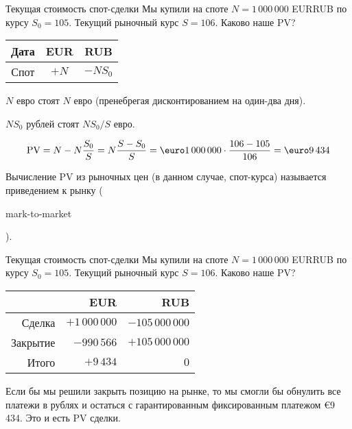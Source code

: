 \documentclass{beamer}
\renewcommand{\EUR}[1]{\textup{\euro}#1}
\newcommand{\en}[1]{\begin{otherlanguage}{english}#1\end{otherlanguage}}
\begin{document}
\begin{frame}{Текущая стоимость спот-сделки}
\justify
Мы купили на споте $N=1\,000\,000$ EURRUB по курсу $S_0 = 105$. Текущий рыночный курс $S=106$. Каково наше PV?

\justify
\centering
\begin{tabular}{c|c|c}
Дата & EUR  & RUB \\ \hline
Спот & $+N$ & $-NS_0$
\end{tabular}

\justify
$N$ евро стоят $N$ евро (пренебрегая дисконтированием на один-два дня).

\justify
$NS_0$ рублей стоят $NS_0/S$ евро.

\begin{align*}
\text{PV} = N - N\frac{S_0}{S} = N\frac{S - S_0}{S} = \EUR{1\,000\,000} \cdot \frac{106 - 105}{106} = \EUR{9\,434}
\end{align*}

\justify
Вычисление PV из рыночных цен (в данном случае, спот-курса) называется \alert{приведением к рынку} (\en{mark-to-market}).
\end{frame}



\begin{frame}{Текущая стоимость спот-сделки}
\justify
Мы купили на споте $N=1\,000\,000$ EURRUB по курсу $S_0 = 105$. Текущий рыночный курс $S=106$. Каково наше PV?

\justify
\centering
\begin{tabular}{r|r|r}
         & EUR               & RUB \\ \hline
Сделка   & $+1\,000\,000$ & $-105\,000\,000$ \\
Закрытие &    $-990\,566$ & $+105\,000\,000$ \\ \hline
Итого    &      $+9\,434$ & $0$
\end{tabular}

\justify
Если бы мы решили закрыть позицию на рынке, то мы смогли бы обнулить все платежи в рублях и остаться с гарантированным фиксированным платежом \EUR{9\,434}. Это и есть PV сделки.
\end{frame}
\end{document}
